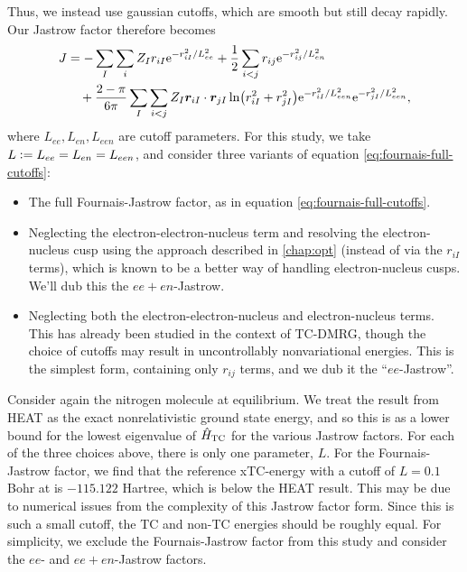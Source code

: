Thus, we instead use gaussian cutoffs, which are smooth but still decay rapidly. Our Jastrow factor therefore becomes
\begin{align}
    \label{eq:fournais-full-cutoffs}
    J &= -\sum_I\sum_i Z_Ir_{iI}\mathrm{e}^{-r_{iI}^2/L_{ee}^2} + \frac 12\sum_{i<j}r_{ij}\mathrm{e}^{-r_{ij}^2/L_{en}^2} \nonumber \\
    &\quad + \frac{2-\pi}{6\pi}\sum_I\sum_{i<j}Z_I\bm r_{iI}\cdot \bm r_{jI}\ln(r_{iI}^2+r_{jI}^2)\mathrm{e}^{-r_{iI}^2/L_{een}^2}\mathrm{e}^{-r_{jI}^2/L_{een}^2},
\end{align}
where $L_{ee}, L_{en}, L_{een}$ are cutoff parameters. For this study, we take $L\mathrel{\mathop:}= L_{ee} = L_{en} = L_{een}$, and consider three variants of equation \ref{eq:fournais-full-cutoffs}:
\begin{itemize}
    \item The full Fournais-Jastrow factor, as in equation \ref{eq:fournais-full-cutoffs}.
    \item Neglecting the electron-electron-nucleus term and resolving the electron-nucleus cusp using the approach described in \autoref{chap:opt} (instead of via the $r_{iI}$ terms), which is known to be a better way of handling electron-nucleus cusps.\supercite{drummondJastrow2004,needsVariational2020} We'll dub this the $ee+en$-Jastrow.
    \item Neglecting both the electron-electron-nucleus and electron-nucleus terms. This has already been studied in the context of TC-DMRG,\supercite{szenesStriking2024} though the choice of cutoffs may result in uncontrollably nonvariational energies. This is the simplest form, containing only $r_{ij}$ terms, and we dub it the ``$ee$-Jastrow''.
\end{itemize}

Consider again the nitrogen molecule at equilibrium. We treat the result from \gls{HEAT}\supercite{fellerSurvey2008} as the exact nonrelativistic ground state energy, and so this is as a lower bound for the lowest eigenvalue of $\hat H_\mathrm{TC}$ for the various Jastrow factors. For each of the three choices above, there is only one parameter, $L$. For the Fournais-Jastrow factor, we find that the reference xTC-energy with a cutoff of $L=0.1$ Bohr at \avtz is $-115.122$ Hartree, which is below the HEAT result. This may be due to numerical issues from the complexity of this Jastrow factor form. Since this is such a small cutoff, the TC and non-TC energies should be roughly equal. For simplicity, we exclude the Fournais-Jastrow factor from this study and consider the $ee$- and $ee+en$-Jastrow factors.

